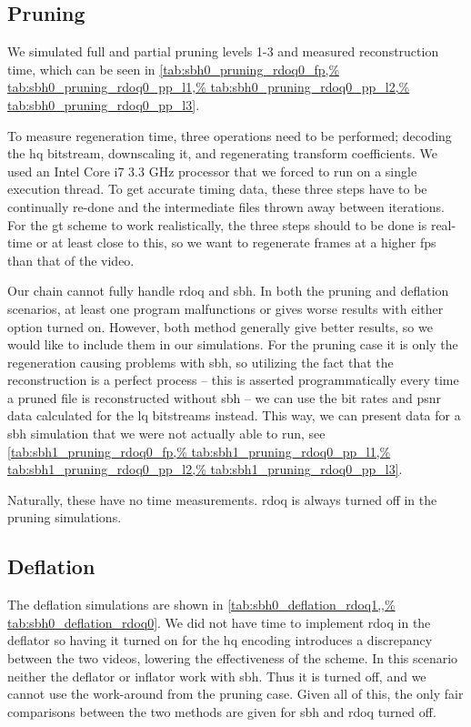\subsection{Pruning}
We simulated full and partial pruning levels 1-3 and measured reconstruction time, which can be seen in \cref{tab:sbh0_pruning_rdoq0_fp,%
tab:sbh0_pruning_rdoq0_pp_l1,%
tab:sbh0_pruning_rdoq0_pp_l2,%
tab:sbh0_pruning_rdoq0_pp_l3}.

To measure regeneration time, three operations need to be performed; decoding the \gls{hq} bitstream, downscaling it, and regenerating transform coefficients. We used an Intel Core i7 3.3 GHz processor that we forced to run on a single execution thread. To get accurate timing data, these three steps have to be continually re-done and the intermediate files thrown away between iterations. For the \gls{gt} scheme to work realistically, the three steps should to be done is real-time or at least close to this, so we want to regenerate frames at a higher \gls{fps} than that of the video.

Our chain cannot fully handle \gls{rdoq} and \gls{sbh}. In both the pruning and deflation scenarios, at least one program malfunctions or gives worse results with either option turned on. However, both method generally give better results, so we would like to include them in our simulations. For the pruning case it is only the regeneration causing problems with \gls{sbh}, so utilizing the fact that the reconstruction is a perfect process -- this is asserted programmatically every time a pruned file is reconstructed without \gls{sbh} -- we can use the bit rates and \gls{psnr} data calculated for the \gls{lq} bitstreams instead. This way, we can present data for a \gls{sbh} simulation that we were not actually able to run, see \cref{tab:sbh1_pruning_rdoq0_fp,%
tab:sbh1_pruning_rdoq0_pp_l1,%
tab:sbh1_pruning_rdoq0_pp_l2,%
tab:sbh1_pruning_rdoq0_pp_l3}.

Naturally, these have no time measurements. \gls{rdoq} is always turned off in the pruning simulations.

\subsection{Deflation}
The deflation simulations are shown in \cref{tab:sbh0_deflation_rdoq1,,%
tab:sbh0_deflation_rdoq0}. We did not have time to implement \gls{rdoq} in the deflator so having it turned on for the \gls{hq} encoding introduces a discrepancy between the two videos, lowering the effectiveness of the scheme. In this scenario neither the deflator or inflator work with \gls{sbh}. Thus it is turned off, and we cannot use the work-around from the pruning case. Given all of this, the only fair comparisons between the two methods are given for \gls{sbh} and \gls{rdoq} turned off.

